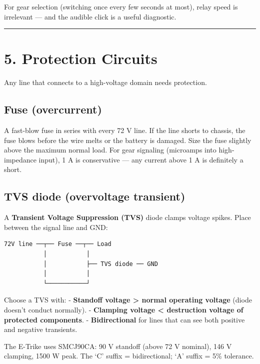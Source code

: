 \documentclass[12pt,a4paper,oneside]{report}
\begin{document}
For gear selection (switching once every few seconds at most), relay speed is
irrelevant --- and the audible click is a useful diagnostic.

\begin{center}\rule{0.5\linewidth}{0.5pt}\end{center}

\section{5. Protection Circuits}\label{protection-circuits}

Any line that connects to a high-voltage domain needs protection.

\subsection{Fuse (overcurrent)}\label{fuse-overcurrent}

A fast-blow fuse in series with every 72 V line. If the line shorts to chassis,
the fuse blows before the wire melts or the battery is damaged. Size the fuse
slightly above the maximum normal load. For gear signaling (microamps into
high-impedance input), 1 A is conservative --- any current above 1 A is
definitely a short.

\subsection{TVS diode (overvoltage
transient)}\label{tvs-diode-overvoltage-transient}

A \textbf{Transient Voltage Suppression (TVS)} diode clamps voltage spikes.
Place between the signal line and GND:

\begin{verbatim}
72V line ──┬── Fuse ──┬── Load
           │           │
           │           ├── TVS diode ── GND
           │           │
           └───────────┘
\end{verbatim}

Choose a TVS with: - \textbf{Standoff voltage \textgreater{} normal operating
voltage} (diode doesn't conduct normally). - \textbf{Clamping voltage
\textless{} destruction voltage of protected components}. -
\textbf{Bidirectional} for lines that can see both positive and negative
transients.

The E-Trike uses SMCJ90CA: 90 V standoff (above 72 V nominal), 146 V clamping,
1500 W peak. The `C' suffix = bidirectional; `A' suffix = 5\% tolerance.
\end{document}
